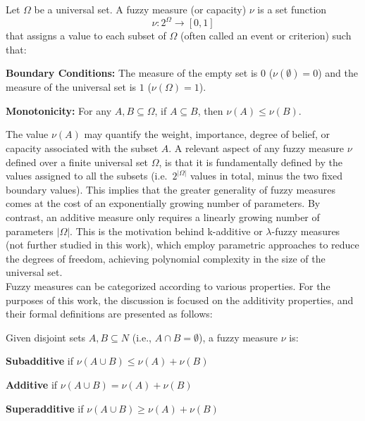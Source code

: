 \begin{definition}
Let $\Omega$ be a universal set. A fuzzy measure (or capacity) $\nu$ is a set function
\[ \nu: 2^\Omega \to [0, 1] \]
that assigns a value to each subset of $\Omega$ (often called an event or criterion) such that:
\begin{romanenum}
    \item \textbf{Boundary Conditions:} The measure of the empty set is $0$ ($\nu(\emptyset) = 0$) and the measure of the universal set is $1$ ($\nu(\Omega) = 1$).

    \item \textbf{Monotonicity:} For any $A, B \subseteq \Omega$, if $A \subseteq B$, then $\nu(A) \le \nu(B)$.
\end{romanenum}
\end{definition}

The value $\nu(A)$ may quantify the weight, importance, degree of belief, or capacity associated with the subset $A$. A relevant aspect of any fuzzy measure $\nu$ defined over a finite universal set $\Omega$, is that it is fundamentally defined by the values assigned to all the subsets (i.e.\ $2^{|\Omega|}$ values in total, minus the two fixed boundary values). This implies that the greater generality of fuzzy measures comes at the cost of an exponentially growing number of parameters. By contrast, an additive measure only requires a linearly growing number of parameters $|\Omega|$. 
This is the motivation behind k-additive or $\lambda$-fuzzy measures (not further studied in this work), which employ parametric approaches to reduce the degrees of freedom, achieving polynomial complexity in the size of the universal set.\\


Fuzzy measures can be categorized according to various properties. For the purposes of this work, the discussion is focused on the additivity properties, and their formal definitions are presented as follows:


\begin{definition}[Additivity]
Given disjoint sets $A,B \subseteq N$ (i.e., $A \cap B = \emptyset$), a fuzzy measure $\nu$ is:
\begin{romanenum}
    \item \textbf{Subadditive} if $\nu(A \cup B) \leq \nu(A) + \nu(B)$ \cite[Def. 2.10, Eq. 2.8]{beliakov2023discrete}
    \item \textbf{Additive} if $\nu(A \cup B) = \nu(A) + \nu(B)$ \cite[Def. 2.4, Eq. 2.1]{beliakov2023discrete}
    \item \textbf{Superadditive} if $\nu(A \cup B) \geq \nu(A) + \nu(B)$ \cite[Def. 2.10, Eq. 2.9]{beliakov2023discrete}
\end{romanenum}
\end{definition}

